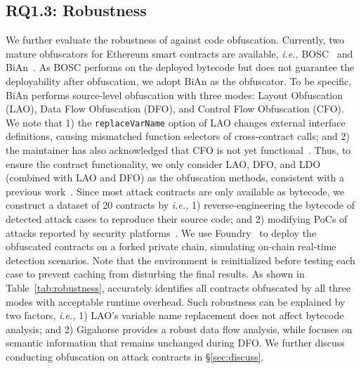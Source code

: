 \subsection{RQ1.3: Robustness}

We further evaluate the robustness of {\tool} against code obfuscation.
Currently, two mature obfuscators for Ethereum smart contracts are available, \textit{i.e.,} BOSC~\cite{yu2022bytecode} and BiAn~\cite{zhang2023bian}.
As BOSC performs on the deployed bytecode but does not guarantee the deployability after obfuscation, we adopt BiAn as the obfuscator.
To be specific, BiAn performs source-level obfuscation with three modes: Layout Obfuscation (LAO), Data Flow Obfuscation (DFO), and Control Flow Obfuscation (CFO). We note that 1) the \texttt{replaceVarName} option of LAO changes external interface definitions, causing mismatched function selectors of cross-contract calls; and 2) the maintainer has also acknowledged that CFO is not yet functional~\cite{bian}. Thus, to ensure the contract functionality, we only consider LAO, DFO, and LDO (combined with LAO and DFO) as the obfuscation methods, consistent with a previous work~\cite{chen2021sadponzi}.
Since most attack contracts are only available as bytecode, we construct a dataset of 20 contracts by \textit{i.e.,} 1) reverse-engineering the bytecode of detected attack cases to reproduce their source code; and 2) modifying PoCs of attacks reported by security platforms~\cite{Defihacklab}.
We use Foundry~\cite{foundry} to deploy the obfuscated contracts on a forked private chain, simulating on-chain real-time detection scenarios. Note that the environment is reinitialized before testing each case to prevent caching from disturbing the final results.
As shown in Table~\ref{tab:robustness}, {\tool} accurately identifies all contracts obfuscated by all three modes with acceptable runtime overhead. Such robustness can be explained by two factors, \textit{i.e.,} 1) LAO's variable name replacement does not affect bytecode analysis; and 2) Gigahorse provides a robust data flow analysis, while {\tool} focuses on semantic information that remains unchanged during DFO.
We further discuss conducting obfuscation on attack contracts in \S\ref{sec:discuss}.



\begin{table}[t]
\centering
\caption{Performance of {\tool} under obfuscation.}
\label{tab:robustness}
\vspace{-0.1in}
\vspace{-0.1in}
\end{table}


